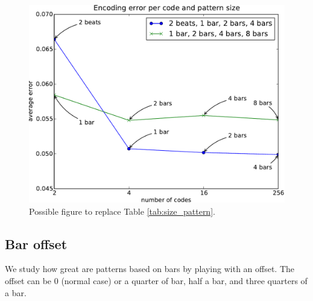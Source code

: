 \documentclass{article}
\begin{document}





\begin{figure}[htb]
\begin{center}
\includegraphics[width=.99\columnwidth]{codesize_patternsize}
\end{center}
\caption{{Possible figure to replace Table \ref{tab:size_pattern}.}}
\label{fig:size_pattern}
\end{figure}


\subsection{Bar offset}
We study how great are patterns based on bars by playing with an offset.
The offset can be $0$ (normal case) or a quarter of bar, half a bar, and
three quarters of a bar.
\end{document}
